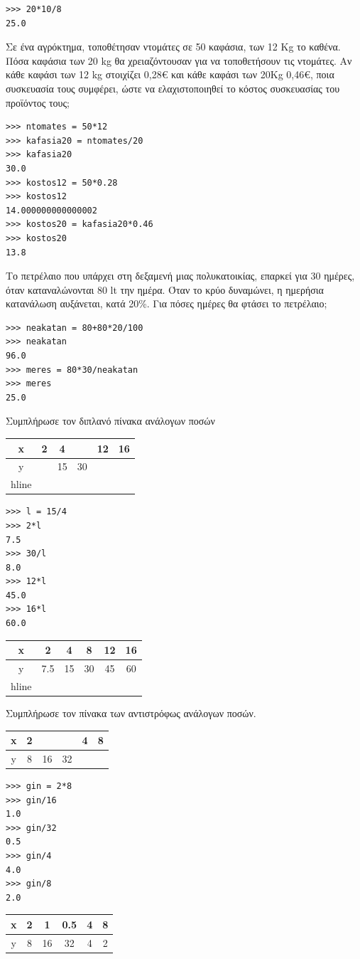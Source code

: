 \begin{lstlisting}
>>> 20*10/8
25.0
\end{lstlisting}
\begin{exercise}
Σε ένα αγρόκτημα, τοποθέτησαν ντομάτες σε 50 καφάσια, των 12 Kg το καθένα. Πόσα καφάσια των 20 kg θα χρειαζόντουσαν για να τοποθετήσουν τις ντομάτες. Αν κάθε καφάσι των 12 kg στοιχίζει 0,28€ και κάθε καφάσι των 20Kg 0,46€, ποια συσκευασία τους συμφέρει, ώστε να ελαχιστοποιηθεί το κόστος συσκευασίας του προϊόντος τους; 
\end{exercise}
\begin{lstlisting}
>>> ntomates = 50*12
>>> kafasia20 = ntomates/20
>>> kafasia20
30.0
>>> kostos12 = 50*0.28
>>> kostos12
14.000000000000002
>>> kostos20 = kafasia20*0.46
>>> kostos20
13.8
\end{lstlisting}
\begin{exercise}
Το πετρέλαιο που υπάρχει στη δεξαμενή μιας πολυκατοικίας, επαρκεί για 30 ημέρες, όταν καταναλώνονται 80 lt την ημέρα. Όταν το κρύο δυναμώνει, η ημερήσια κατανάλωση αυξάνεται, κατά 20\%. Για πόσες ημέρες θα φτάσει το πετρέλαιο;
\end{exercise}
\begin{lstlisting}
>>> neakatan = 80+80*20/100
>>> neakatan
96.0
>>> meres = 80*30/neakatan
>>> meres
25.0
\end{lstlisting}
\begin{exercise}
Συμπλήρωσε	τον	διπλανό	πίνακα	ανάλογων ποσών
\begin{table}
\begin{tabular}{|c|c|c|c|c|c|}
x&2&4 &  &12&16\\\hline
y&  &15&30& &\\hline
\end{tabular}
\end{table}
\end{exercise}
\begin{lstlisting}
>>> l = 15/4
>>> 2*l
7.5
>>> 30/l
8.0
>>> 12*l
45.0
>>> 16*l
60.0
\end{lstlisting}
\begin{table}
\begin{tabular}{|c|c|c|c|c|c|}
x&2   &4  &8 &12&16\\\hline
y&7.5&15&30&45 &60\\hline
\end{tabular}
\end{table}
\begin{exercise}
Συμπλήρωσε τον πίνακα των αντιστρόφως ανάλογων ποσών.
\begin{table}
\begin{tabular}{|c|c|c|c|c|c|}
x& 2&&&4&8\\\hline
y& 8&16&32&&\\\hline
\end{tabular}
\end{table}
\end{exercise}
\begin{lstlisting}
>>> gin = 2*8
>>> gin/16
1.0
>>> gin/32
0.5
>>> gin/4
4.0
>>> gin/8
2.0
\end{lstlisting}
\begin{table}
\begin{tabular}{|c|c|c|c|c|c|}
x& 2&  1&0.5&4&8\\\hline
y& 8&16&32&4&2\\\hline
\end{tabular}
\end{table}
